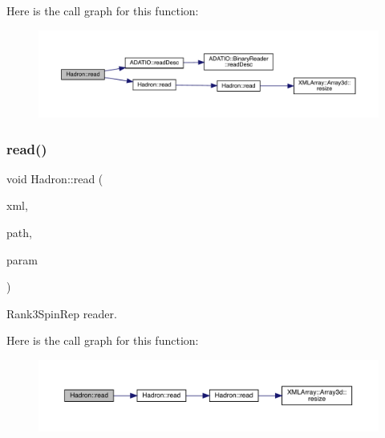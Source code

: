 Here is the call graph for this function\+:
\nopagebreak
\begin{figure}[H]
\begin{center}
\leavevmode
\includegraphics[width=350pt]{d1/daf/namespaceHadron_a0567f3fb8f2db68b0a93251138c13a62_cgraph}
\end{center}
\end{figure}
\mbox{\label{namespaceHadron_a2d26ed6a48c098506babe8e03425a183}} 
\subsubsection{\texorpdfstring{read()}{read()}\hspace{0.1cm}{\footnotesize\ttfamily [82/94]}}
{\footnotesize\ttfamily void Hadron\+::read (\begin{DoxyParamCaption}\item[{\mbox{\hyperlink{classADATXML_1_1XMLReader}{X\+M\+L\+Reader}} \&}]{xml,  }\item[{const std\+::string \&}]{path,  }\item[{\mbox{\hyperlink{structHadron_1_1Rank3SpinRep__t}{Rank3\+Spin\+Rep\+\_\+t}} \&}]{param }\end{DoxyParamCaption})}



Rank3\+Spin\+Rep reader. 

Here is the call graph for this function\+:
\nopagebreak
\begin{figure}[H]
\begin{center}
\leavevmode
\includegraphics[width=350pt]{d1/daf/namespaceHadron_a2d26ed6a48c098506babe8e03425a183_cgraph}
\end{center}
\end{figure}
\mbox{\label{namespaceHadron_a05878acca51117e3c410ba16500c4ba5}} 
